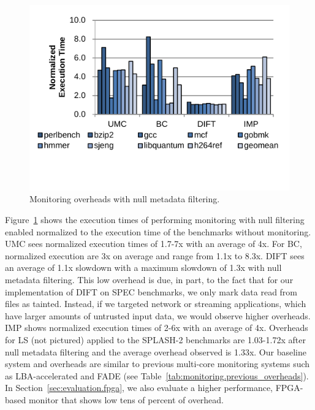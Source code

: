 \begin{figure}
  \begin{center}
    \includegraphics[width=\columnwidth, clip=true, trim=0 0.5in 0 0.1in]{figs/data_filtering.pdf}
    \vspace{-0.2in}
    \caption{Monitoring overheads with null metadata filtering.}
    \label{fig:evaluation.filtering}
    \vspace{-0.1in}
  \end{center}
\end{figure}

Figure~\ref{fig:evaluation.filtering} shows the
execution times of performing monitoring with null filtering enabled normalized
to the execution time of the benchmarks without monitoring. UMC sees normalized
execution times of 1.7-7x with an average of 4x.
For BC, normalized execution
are 3x on average and range from 1.1x to 8.3x.
DIFT sees an average of 1.1x slowdown with a maximum slowdown of 1.3x with null
metadata filtering. This low overhead is due, in part, to the fact
that for our implementation of DIFT on SPEC
benchmarks, we only mark data read from files as tainted. Instead, if we
targeted network or streaming applications, which have larger amounts of
untrusted input data, we would observe higher overheads. IMP shows normalized
execution times of 2-6x with an average of 4x. Overheads for LS (not pictured)
applied to the SPLASH-2 benchmarks are
1.03-1.72x after null metadata filtering and the average
overhead observed is 1.33x.
Our baseline system and overheads are similar to previous multi-core
monitoring systems such as LBA-accelerated \cite{lba-isca08} and FADE
\cite{fade-hpca14} (see
Table~\ref{tab:monitoring.previous_overheads}). In
Section~\ref{sec:evaluation.fpga}, we also evaluate a higher performance, FPGA-based
monitor that shows low tens of percent of overhead. 

